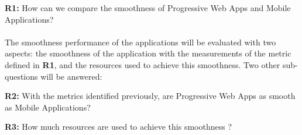 \documentclass{kththesis}
\begin{document}
\textbf{R1:} How can we compare the smoothness of Progressive Web Apps and Mobile Applications?

\paragraph{}
The smoothness performance of the applications will be evaluated with two aspects: the smoothness of the application with the measurements of the metric defined in \textbf{R1}, and the resources used to achieve this smoothness. Two other sub-questions will be answered: \newline

\textbf{R2:} With the metrics identified previously, are Progressive Web Apps as smooth as Mobile Applications? \newline

\medskip

\textbf{R3:} How much resources are used to achieve this smoothness ?





\end{document}
